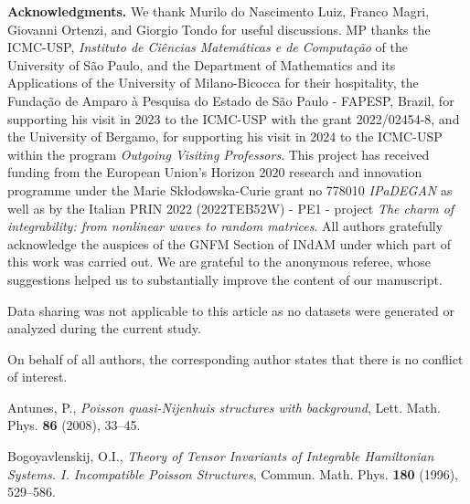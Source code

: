 \documentclass[12pt]{article}
\begin{document}

\par\medskip\noindent
{\bf Acknowledgments.} 
We thank Murilo do Nascimento Luiz, Franco Magri, Giovanni Ortenzi, and Giorgio Tondo for useful discussions. MP thanks the ICMC-USP, {\em Instituto de Ci\^encias Matem\'aticas e de Computa\c c\~ao\/} of the University of S\~ao Paulo, and the Department of Mathematics and its Applications of the University of Milano-Bicocca for their hospitality, the Funda\c c\~ao de Amparo \`a Pesquisa do Estado de S\~ao Paulo - FAPESP, Brazil, for supporting his visit in 2023 to the ICMC-USP with the grant 2022/02454-8, and the University of Bergamo, for supporting his visit in 2024 to the ICMC-USP within the program {\em Outgoing Visiting Professors}.
This project has received funding from the European Union's Horizon 2020 research and innovation programme under the 
Marie Sk{\l}odowska-Curie grant no 778010 {\em IPaDEGAN} as well as by the Italian PRIN 2022 (2022TEB52W) - PE1 - project {\em The charm of integrability: from nonlinear waves to random matrices}. All authors gratefully acknowledge the auspices of the GNFM Section of INdAM under which part of this work was carried out. %
We are grateful to the anonymous referee, whose suggestions helped us to substantially improve the content 
of our manuscript.


\medskip{} Data sharing was not applicable to this article as no datasets were generated or analyzed during the current study.


\medskip{} On behalf of all authors, the corresponding author states that there is no conflict of interest.


Antunes, P., {\it Poisson quasi-Nijenhuis structures with background}, Lett. Math. Phys. {\bf 86} (2008), 33--45.

 Bogoyavlenskij, O.I., {\it Theory of Tensor Invariants of Integrable Hamiltonian Systems. I. Incompatible Poisson Structures}, 
Commun. Math. Phys. {\bf 180} (1996), 529--586.
\end{document}
